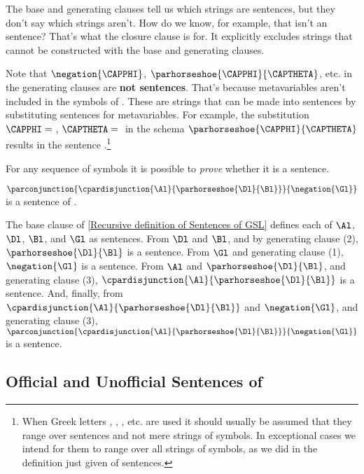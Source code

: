 The base and generating clauses tell us which strings are sentences, but they don't say which strings aren't.
How do we know, for example, that \mention{$(\Bl(\HORSESHOE{}\Al$} isn't an \GSL{} sentence?
That's what the closure clause is for.
It explicitly excludes strings that cannot be constructed with the base and generating clauses.

Note that $\negation{\CAPPHI}$, $\parhorseshoe{\CAPPHI}{\CAPTHETA}$, etc. in the generating clauses are \textbf{not \GSL{} sentences}.
That's because metavariables aren't included in the symbols of \GSL{}.
These  are strings that can be made into sentences by substituting sentences for metavariables.
For example, the substitution $\CAPPHI=\;$\mention{$\Al$}, $\CAPTHETA=\;$\mention{$\partriplebar{\Cl}{\Dl}$} in the schema $\parhorseshoe{\CAPPHI}{\CAPTHETA}$ results in the sentence \mention{$\parhorseshoe{\Al}{\partriplebar{\Cl}{\Dl}}$}.\footnote{When Greek letters \mention{$\CAPPHI$}, \mention{$\CAPPSI$}, \mention{$\CAPTHETA$}, etc. are used it should usually be assumed that they range over \GSL{} sentences and not mere strings of \GSL{} symbols. 
In exceptional cases we intend for them to range over all strings of \GSL{} symbols, as we did in the definition just given of \GSL{} sentences.}

For any sequence of \GSL{} symbols it is possible to \emph{prove} whether it is a sentence.

\begin{majorILnc}{}
$\parconjunction{\cpardisjunction{\Al}{\parhorseshoe{\Dl}{\Bl}}}{\negation{\Gl}}$ is a sentence of \GSL{}. 

\noindent{}The base clause of \ref{Recursive definition of Sentences of GSL} defines each of $\Al$, $\Dl$, $\Bl$, and $\Gl$ as sentences. 
From $\Dl$ and $\Bl$, and by generating clause (2), $\parhorseshoe{\Dl}{\Bl}$ is a sentence. 
From $\Gl$ and generating clause (1), $\negation{\Gl}$ is a sentence. 
From $\Al$ and $\parhorseshoe{\Dl}{\Bl}$, and generating clause (3), $\cpardisjunction{\Al}{\parhorseshoe{\Dl}{\Bl}}$ is a sentence. 
And, finally, from $\cpardisjunction{\Al}{\parhorseshoe{\Dl}{\Bl}}$ and $\negation{\Gl}$, and generating clause (3), $\parconjunction{\cpardisjunction{\Al}{\parhorseshoe{\Dl}{\Bl}}}{\negation{\Gl}}$ is a sentence. 
\end{majorILnc}

\subsection{Official and Unofficial Sentences of \GSL{}}\label{Unofficial Sentences of GSL}

